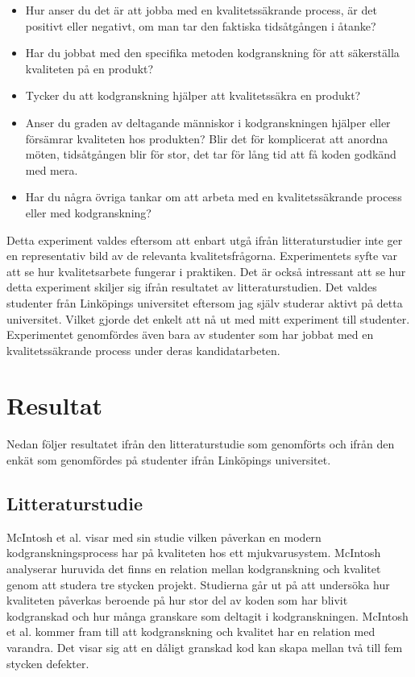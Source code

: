 \begin{itemize}
	\item Hur anser du det är att jobba med en kvalitetssäkrande process, är det positivt eller negativt, om man tar den faktiska tidsåtgången i åtanke?
	\item Har du jobbat med den specifika metoden kodgranskning för att säkerställa kvaliteten på en produkt?
	\item Tycker du att kodgranskning hjälper att kvalitetssäkra en produkt?
	\item Anser du graden av deltagande människor i kodgranskningen hjälper eller försämrar kvaliteten hos produkten? Blir det för komplicerat att anordna möten, tidsåtgången blir för stor, det tar för lång tid att få koden godkänd med mera.
	\item Har du några övriga tankar om att arbeta med en kvalitetssäkrande process eller med kodgranskning?
\end{itemize}
Detta experiment valdes eftersom att enbart utgå ifrån litteraturstudier inte ger en representativ bild av de relevanta kvalitetsfrågorna. Experimentets syfte var att se hur kvalitets\-arbete fungerar i praktiken. Det är också intressant att se hur detta experiment skiljer sig ifrån resultatet av litteraturstudien. Det valdes studenter från Linköpings universitet eftersom jag själv studerar aktivt på detta universitet. Vilket gjorde det enkelt att nå ut med mitt experiment till studenter. Experimentet genomfördes även bara av studenter som har jobbat med en kvalitetssäkrande process under deras kandidatarbeten.

\section{Resultat}
\label{sec:results-wallstrom}
Nedan följer resultatet ifrån den litteraturstudie som genomförts och ifrån den enkät som genomfördes på studenter ifrån Linköpings universitet. 

\subsection{Litteraturstudie}
McIntosh et al. \cite{mcintosh2014impact} visar med sin studie vilken påverkan en modern kodgranskningsprocess har på kvaliteten hos ett mjukvarusystem. McIntosh analyserar huruvida det finns en relation mellan kodgranskning och kvalitet genom att studera tre stycken projekt. Studierna går ut på att undersöka hur kvaliteten påverkas beroende på hur stor del av koden som har blivit kodgranskad och hur många granskare som deltagit i kodgranskningen. McIntosh et al. \cite{mcintosh2014impact} kommer fram till att kodgranskning och kvalitet har en relation med varandra. Det visar sig att en dåligt granskad kod kan skapa mellan två till fem stycken defekter.

